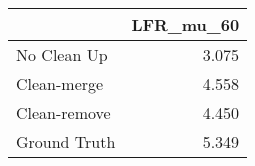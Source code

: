 \begin{tabular}{lr}
\toprule
{} & LFR_mu_60 \\
\midrule
No Clean Up  &     3.075 \\
Clean-merge  &     4.558 \\
Clean-remove &     4.450 \\
Ground Truth &     5.349 \\
\bottomrule
\end{tabular}
